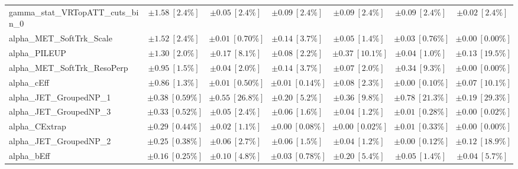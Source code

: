 \begin{sidewaystable}
\begin{center}
\begin{tabular*}{\textwidth}{@{\extracolsep{\fill}}lcccccc}
gamma\_stat\_VRTopATT\_cuts\_bin\_0         & $\pm 1.58\ [2.4\%] $          & $\pm 0.05\ [2.4\%] $          & $\pm 0.09\ [2.4\%] $          & $\pm 0.09\ [2.4\%] $          & $\pm 0.09\ [2.4\%] $          & $\pm 0.02\ [2.4\%] $       \\
alpha\_MET\_SoftTrk\_Scale         & $\pm 1.52\ [2.4\%] $          & $\pm 0.01\ [0.70\%] $          & $\pm 0.14\ [3.7\%] $          & $\pm 0.05\ [1.4\%] $          & $\pm 0.03\ [0.76\%] $          & $\pm 0.00\ [0.00\%] $       \\
alpha\_PILEUP         & $\pm 1.30\ [2.0\%] $          & $\pm 0.17\ [8.1\%] $          & $\pm 0.08\ [2.2\%] $          & $\pm 0.37\ [10.1\%] $          & $\pm 0.04\ [1.0\%] $          & $\pm 0.13\ [19.5\%] $       \\
alpha\_MET\_SoftTrk\_ResoPerp         & $\pm 0.95\ [1.5\%] $          & $\pm 0.04\ [2.0\%] $          & $\pm 0.14\ [3.7\%] $          & $\pm 0.07\ [2.0\%] $          & $\pm 0.34\ [9.3\%] $          & $\pm 0.00\ [0.00\%] $       \\
alpha\_cEff         & $\pm 0.86\ [1.3\%] $          & $\pm 0.01\ [0.50\%] $          & $\pm 0.01\ [0.14\%] $          & $\pm 0.08\ [2.3\%] $          & $\pm 0.00\ [0.10\%] $          & $\pm 0.07\ [10.1\%] $       \\
alpha\_JET\_GroupedNP\_1         & $\pm 0.38\ [0.59\%] $          & $\pm 0.55\ [26.8\%] $          & $\pm 0.20\ [5.2\%] $          & $\pm 0.36\ [9.8\%] $          & $\pm 0.78\ [21.3\%] $          & $\pm 0.19\ [29.3\%] $       \\
alpha\_JET\_GroupedNP\_3         & $\pm 0.33\ [0.52\%] $          & $\pm 0.05\ [2.4\%] $          & $\pm 0.06\ [1.6\%] $          & $\pm 0.04\ [1.2\%] $          & $\pm 0.01\ [0.28\%] $          & $\pm 0.00\ [0.02\%] $       \\
alpha\_CExtrap         & $\pm 0.29\ [0.44\%] $          & $\pm 0.02\ [1.1\%] $          & $\pm 0.00\ [0.08\%] $          & $\pm 0.00\ [0.02\%] $          & $\pm 0.01\ [0.33\%] $          & $\pm 0.00\ [0.00\%] $       \\
alpha\_JET\_GroupedNP\_2         & $\pm 0.25\ [0.38\%] $          & $\pm 0.06\ [2.7\%] $          & $\pm 0.06\ [1.5\%] $          & $\pm 0.04\ [1.2\%] $          & $\pm 0.00\ [0.12\%] $          & $\pm 0.12\ [18.9\%] $       \\
alpha\_bEff         & $\pm 0.16\ [0.25\%] $          & $\pm 0.10\ [4.8\%] $          & $\pm 0.03\ [0.78\%] $          & $\pm 0.20\ [5.4\%] $          & $\pm 0.05\ [1.4\%] $          & $\pm 0.04\ [5.7\%] $       \\

\end{tabular*}
\end{center}
\end{sidewaystable}

